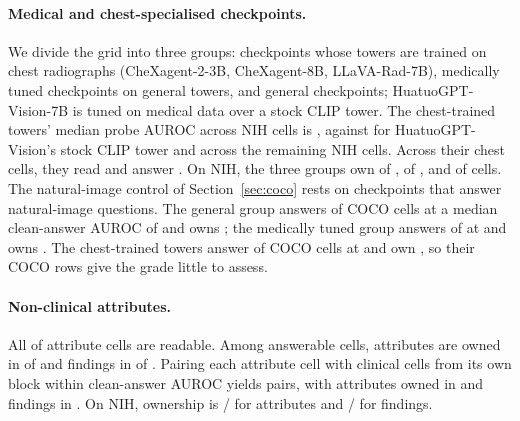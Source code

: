 \documentclass{article}
\begin{document}
\paragraph{Medical and chest-specialised checkpoints.} We divide the grid into three groups: checkpoints whose towers are trained on chest radiographs (CheXagent-2-3B, CheXagent-8B, LLaVA-Rad-7B), medically tuned checkpoints on general towers, and general checkpoints; HuatuoGPT-Vision-7B is tuned on medical data over a stock CLIP tower. The chest-trained towers' median probe AUROC across \cfSpecTowerProbeN{} NIH cells is \cfSpecTowerProbeAuroc{}, against \cfSpecStockProbeAuroc{} for HuatuoGPT-Vision's stock CLIP tower and \cfSpecRestProbeAuroc{} across the \cfSpecRestProbeN{} remaining NIH cells. Across their \cfSpecTowerN{} chest cells, they read \cfSpecTowerReadable{} and answer \cfSpecTowerAnswerable{}. On NIH, the three groups own \cfSpecNihTowerOwned{} of \cfSpecNihTowerN{}, \cfSpecNihMedOwned{} of \cfSpecNihMedN{}, and \cfSpecNihGenOwned{} of \cfSpecNihGenN{} cells. The natural-image control of Section~\ref{sec:coco} rests on checkpoints that answer natural-image questions. The general group answers \cfSpecGenCocoAnswerable{} of \cfSpecGenCocoN{} COCO cells at a median clean-answer AUROC of \cfSpecGenCocoAnsAuroc{} and owns \cfSpecGenCocoOwned{}; the medically tuned group answers \cfSpecMedCocoAnswerable{} of \cfSpecMedCocoN{} at \cfSpecMedCocoAnsAuroc{} and owns \cfSpecMedCocoOwned{}. The chest-trained towers answer \cfSpecTowerCocoAnswerable{} of \cfSpecTowerCocoN{} COCO cells at \cfSpecTowerCocoAnsAuroc{} and own \cfSpecTowerCocoOwned{}, so their COCO rows give the grade little to assess.

\paragraph{Non-clinical attributes.} All \cfAttrReadable{} of \cfAttrChestAttrN{} attribute cells are readable. Among answerable cells, attributes are owned in \cfAttrCapAttrOwned{} of \cfAttrCapAttrN{} and findings in \cfAttrCapClinOwned{} of \cfAttrCapClinN{}. Pairing each attribute cell with clinical cells from its own block within \cfAttrPairWindow{} clean-answer AUROC yields \cfAttrPairAttrN{} pairs, with attributes owned in \cfAttrPairAttrOwned{} and findings in \cfAttrPairClinOwned{}. On NIH, ownership is \cfAttrNihAttrOwned{}/\cfAttrNihAttrN{} for attributes and \cfAttrNihClinOwned{}/\cfAttrNihClinN{} for findings.
\end{document}
